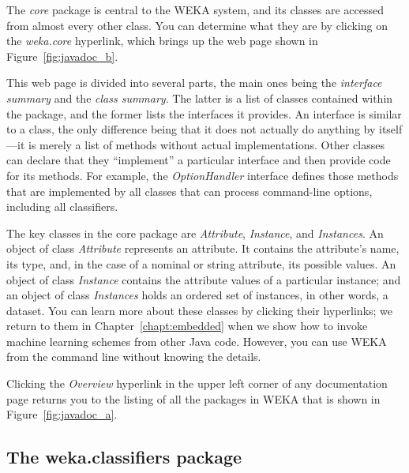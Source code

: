 The \textit{core} package is central to the WEKA system, and its
classes are accessed from almost every other class. You can determine
what they are by clicking on the \textit{weka.core} hyperlink, which
brings up the web page shown in Figure~\ref{fig:javadoc_b}.

This web page is divided into several parts, the main ones being the
\textit{interface summary} and the \textit{class summary}. The latter
is a list of classes contained within the package, and the former
lists the interfaces it provides. An interface is similar to a class,
the only difference being that it does not actually do anything by
itself---it is merely a list of methods without actual
implementations. Other classes can declare that they ``implement'' a
particular interface and then provide code for its methods. For
example, the \textit{OptionHandler} interface defines those methods
that are implemented by all classes that can process command-line
options, including all classifiers.

The key classes in the core package are \textit{Attribute},
\textit{Instance}, and \textit{Instances}. An object of class
\textit{Attribute} represents an attribute. It contains the
attribute's name, its type, and, in the case of a nominal or string
attribute, its possible values. An object of class \textit{Instance}
contains the attribute values of a particular instance; and an object
of class \textit{Instances} holds an ordered set of instances, in
other words, a dataset. You can learn more about these classes by
clicking their hyperlinks; we return to them in
Chapter~\ref{chapt:embedded} when we show how to invoke machine
learning schemes from other Java code. However, you can use WEKA from
the command line without knowing the details.

Clicking the \textit{Overview} hyperlink in the upper left corner of
any documentation page returns you to the listing of all the packages
in WEKA that is shown in Figure~\ref{fig:javadoc_a}.

\subsection{The weka.classifiers package}

